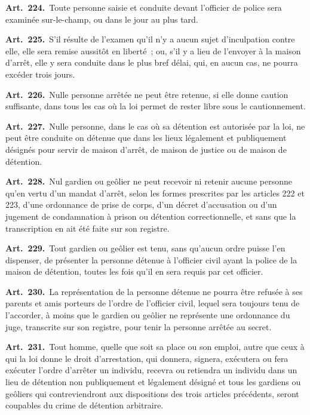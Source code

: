 \documentclass[french,twoside]{book} %
\newcommand{\labelchar}[1]{\textbf{\color{rubric} #1}}
\begin{document}
\labelchar{Art. 224.} Toute personne saisie et conduite devant l’officier de police sera examinée sur-le-champ, ou dans le jour au plus tard.\par
\labelchar{Art. 225.} S’il résulte de l’examen qu’il n’y a aucun sujet d’inculpation contre elle, elle sera remise aussitôt en liberté ; ou, s’il y a lieu de l’envoyer à la maison d’arrêt, elle y sera conduite dans le plus bref délai, qui, en aucun cas, ne pourra excéder trois jours.\par
\labelchar{Art. 226.} Nulle personne arrêtée ne peut être retenue, si elle donne caution suffisante, dans tous les cas où la loi permet de rester libre sous le cautionnement.\par
\labelchar{Art. 227.} Nulle personne, dans le cas où sa détention est autorisée par la loi, ne peut être conduite on détenue que dans les lieux légalement et publiquement désignés pour servir de maison d’arrêt, de maison de justice ou de maison de détention.\par
\labelchar{Art. 228.} Nul gardien ou geôlier ne peut recevoir ni retenir aucune personne qu’en vertu d’un mandat d’arrêt, selon les formes prescrites par les articles 222 et 223, d’une ordonnance de prise de corps, d’un décret d’accusation ou d’un jugement de condamnation à prison ou détention correctionnelle, et sans que la transcription en ait été faite sur son registre.\par
\labelchar{Art. 229.} Tout gardien ou geôlier est tenu, sans qu’aucun ordre puisse l’en dispenser, de présenter la personne détenue à l’officier civil ayant la police de la maison de détention, toutes les fois qu’il en sera requis par cet officier.\par
\labelchar{Art. 230.} La représentation de la personne détenue ne pourra être refusée à ses parents et amis porteurs de l’ordre de l’officier civil, lequel sera toujours tenu de l’accorder, à moins que le gardien ou geôlier ne représente une ordonnance du juge, transcrite sur son registre, pour tenir la personne arrêtée au secret.\par
\labelchar{Art. 231.} Tout homme, quelle que soit sa place ou son emploi, autre que ceux à qui la loi donne le droit d’arrestation, qui donnera, signera, exécutera ou fera exécuter l’ordre d’arrêter un individu, recevra ou retiendra un individu dans un lieu de détention non publiquement et légalement désigné et tous les gardiens ou geôliers qui contreviendront aux dispositions des trois articles précédents, seront coupables du crime de détention arbitraire.\par
\end{document}
